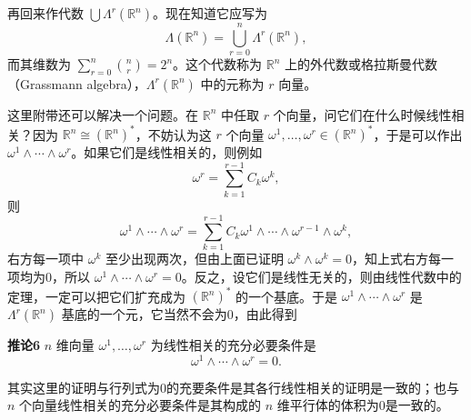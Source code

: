 再回来作代数 $\bigcup\Lambda^r(\mathbb R^n)$。现在知道它应写为
\[
 \Lambda(\mathbb R^n)=\bigcup_{r=0}^n\Lambda^r(\mathbb R^n),
\]
而其维数为 $\sum_{r=0}^n\binom nr=2^n$。这个代数称为 $\mathbb R^n$ 上的外代数或格拉斯曼代数（Grassmann algebra），$\Lambda^r(\mathbb R^n)$ 中的元称为 $r$ 向量。

这里附带还可以解决一个问题。在 $\mathbb R^n$ 中任取 $r$ 个向量，问它们在什么时候线性相关？因为 $\mathbb R^n\cong(\mathbb R^n)^*$，不妨认为这 $r$ 个向量 $\omega^1,\ldots,\omega^r\in(\mathbb R^n)^*$，于是可以作出 $\omega^1\wedge\cdots\wedge\omega^r$。如果它们是线性相关的，则例如
\[
 \omega^r=\sum_{k=1}^{r-1}C_k\omega^k,
\]
则
\[
 \omega^1\wedge\cdots\wedge\omega^r
 =\sum_{k=1}^{r-1}C_k\omega^1\wedge\cdots\wedge\omega^{r-1}\wedge\omega^k,
\]
右方每一项中 $\omega^k$ 至少出现两次，但由上面已证明 $\omega^k\wedge\omega^k=0$，知上式右方每一项均为0，所以 $\omega^1\wedge\cdots\wedge\omega^r=0$。反之，设它们是线性无关的，则由线性代数中的定理，一定可以把它们扩充成为 $(\mathbb R^n)^*$ 的一个基底。于是 $\omega^1\wedge\cdots\wedge\omega^r$ 是 $\Lambda^r(\mathbb R^n)$ 基底的一个元，它当然不会为0，由此得到

\noindent\textbf{推论6}
$n$ 维向量 $\omega^1,\ldots,\omega^r$ 为线性相关的充分必要条件是
\begin{equation}
 \omega^1\wedge\cdots\wedge\omega^r=0.
 \tag{28}
\end{equation}

其实这里的证明与行列式为0的充要条件是其各行线性相关的证明是一致的；也与 $n$ 个向量线性相关的充分必要条件是其构成的 $n$ 维平行体的体积为0是一致的。

